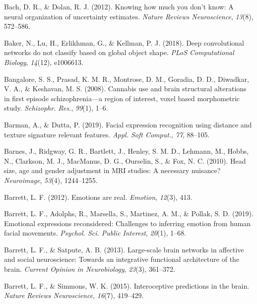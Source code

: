\documentclass[12pt,american,a4paper,oneside,]{memoir} %
\begin{document}
\leavevmode\hypertarget{ref-bach2012knowing}{}%
Bach, D. R., \& Dolan, R. J. (2012). Knowing how much you don't know: A neural organization of uncertainty estimates. \emph{Nature Reviews Neuroscience}, \emph{13}(8), 572--586.

\leavevmode\hypertarget{ref-baker2018deep}{}%
Baker, N., Lu, H., Erlikhman, G., \& Kellman, P. J. (2018). Deep convolutional networks do not classify based on global object shape. \emph{PLoS Computational Biology}, \emph{14}(12), e1006613.

\leavevmode\hypertarget{ref-Bangalore2008-kc}{}%
Bangalore, S. S., Prasad, K. M. R., Montrose, D. M., Goradia, D. D., Diwadkar, V. A., \& Keshavan, M. S. (2008). Cannabis use and brain structural alterations in first episode schizophrenia---a region of interest, voxel based morphometric study. \emph{Schizophr. Res.}, \emph{99}(1), 1--6.

\leavevmode\hypertarget{ref-Barman2019-af}{}%
Barman, A., \& Dutta, P. (2019). Facial expression recognition using distance and texture signature relevant features. \emph{Appl. Soft Comput.}, \emph{77}, 88--105.

\leavevmode\hypertarget{ref-Barnes2010-pu}{}%
Barnes, J., Ridgway, G. R., Bartlett, J., Henley, S. M. D., Lehmann, M., Hobbs, N., Clarkson, M. J., MacManus, D. G., Ourselin, S., \& Fox, N. C. (2010). Head size, age and gender adjustment in MRI studies: A necessary nuisance? \emph{Neuroimage}, \emph{53}(4), 1244--1255.

\leavevmode\hypertarget{ref-barrett2012emotions}{}%
Barrett, L. F. (2012). Emotions are real. \emph{Emotion}, \emph{12}(3), 413.

\leavevmode\hypertarget{ref-Barrett2019-bc}{}%
Barrett, L. F., Adolphs, R., Marsella, S., Martinez, A. M., \& Pollak, S. D. (2019). Emotional expressions reconsidered: Challenges to inferring emotion from human facial movements. \emph{Psychol. Sci. Public Interest}, \emph{20}(1), 1--68.

\leavevmode\hypertarget{ref-barrett2013large}{}%
Barrett, L. F., \& Satpute, A. B. (2013). Large-scale brain networks in affective and social neuroscience: Towards an integrative functional architecture of the brain. \emph{Current Opinion in Neurobiology}, \emph{23}(3), 361--372.

\leavevmode\hypertarget{ref-barrett2015interoceptive}{}%
Barrett, L. F., \& Simmons, W. K. (2015). Interoceptive predictions in the brain. \emph{Nature Reviews Neuroscience}, \emph{16}(7), 419--429.
\end{document}
